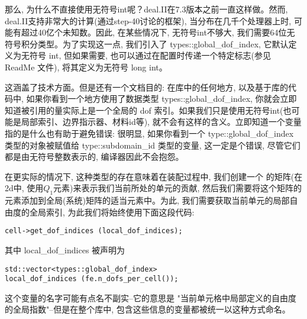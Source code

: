 \documentclass[12pt, a4paper, oneside]{ctexart}
\begin{document}
那么, 为什么不直接使用无符号int呢？deal.II在7.3版本之前一直这样做。然而, deal.II支持非常大的计算(通过step-40讨论的框架), 当分布在几千个处理器上时, 可能有超过40亿个未知数。因此, 在某些情况下, 无符号int不够大, 我们需要64位无符号积分类型。为了实现这一点, 我们引入了 types::global\_dof\_index, 它默认定义为无符号 int, 但如果需要, 也可以通过在配置时传递一个特定标志(参见 ReadMe 文件), 将其定义为无符号 long int。

这涵盖了技术方面。但是还有一个文档目的: 在库中的任何地方, 以及基于库的代码中, 如果你看到一个地方使用了数据类型 types::global\_dof\_index, 你就会立即知道被引用的量实际上是一个全局的 dof 索引。如果我们只是使用无符号int(也可能是局部索引、边界指示器、材料id等), 就不会有这样的含义。立即知道一个变量指的是什么也有助于避免错误: 很明显, 如果你看到一个 type::global\_dof\_index 类型的对象被赋值给 type::subdomain\_id 类型的变量, 这一定是个错误, 尽管它们都是由无符号整数表示的, 编译器因此不会抱怨。

在更实际的情况下, 这种类型的存在意味着在装配过程中, 我们创建一个
的矩阵(在2d中, 使用$Q_1$元素)来表示我们当前所处的单元的贡献, 然后我们需要将这个矩阵的元素添加到全局(系统)矩阵的适当元素中。为此, 我们需要获取当前单元的局部自由度的全局索引, 为此我们将始终使用下面这段代码: 
\lstset{language=C++}
\begin{lstlisting}
cell->get_dof_indices (local_dof_indices);
\end{lstlisting}
其中 local\_dof\_indices 被声明为
\lstset{language=C++}
\begin{lstlisting}
std::vector<types::global_dof_index> 
local_dof_indices (fe.n_dofs_per_cell());
\end{lstlisting}
这个变量的名字可能有点名不副实--它的意思是 "当前单元格中局部定义的自由度的全局指数"--但是在整个库中, 包含这些信息的变量都被统一以这种方式命名。
\end{document}
